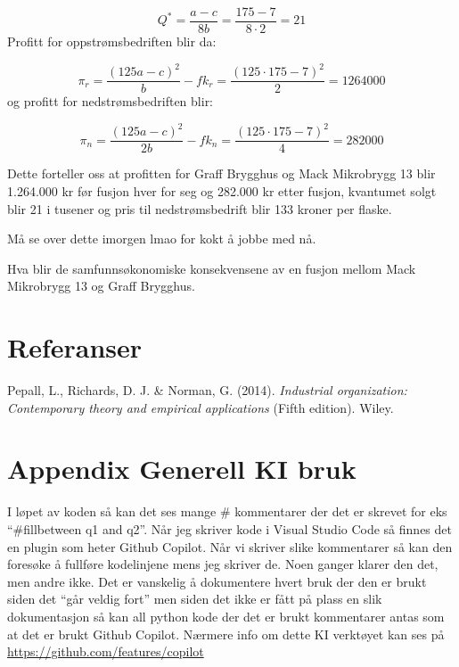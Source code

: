 \documentclass[
  12pt,
  a4paper,
  DIV=11,
  numbers=noendperiod]{scrartcl}
\newlength{\cslhangindent}
\newenvironment{CSLReferences}[2] %
 {\begin{list}{}{%
  \setlength{\itemindent}{0pt}
  \setlength{\leftmargin}{0pt}
  \setlength{\parsep}{0pt}
  \ifodd #1
   \setlength{\leftmargin}{\cslhangindent}
   \setlength{\itemindent}{-1\cslhangindent}
  \fi
  \setlength{\itemsep}{#2\baselineskip}}}
 {\end{list}}
\begin{document}
\[Q^* = \frac{a - c}{8b} = \frac{175 - 7}{8 \cdot 2} = 21 \tag{56}\]
Profitt for oppstrømsbedriften blir da:

\[\pi_r = \frac{(125a - c)^2}{b} - fk_r = \frac{(125 \cdot 175- 7)^2}{2}= 1264000 \tag{57}\]
og profitt for nedstrømsbedriften blir:

\[\pi_n = \frac{(125a - c)^2}{2b} - fk_n = \frac{(125 \cdot 175- 7)^2}{4}= 282000\tag{58}\]

Dette forteller oss at profitten for Graff Brygghus og Mack Mikrobrygg
13 blir 1.264.000 kr før fusjon hver for seg og 282.000 kr etter fusjon,
kvantumet solgt blir 21 i tusener og pris til nedstrømsbedrift blir 133
kroner per flaske.

Må se over dette imorgen lmao for kokt å jobbe med nå.

Hva blir de samfunnsøkonomiske konsekvensene av en fusjon mellom Mack
Mikrobrygg 13 og Graff Brygghus.

\clearpage

\section{Referanser}\label{referanser}

\label{refs}
\begin{CSLReferences}{1}{0}
Pepall, L., Richards, D. J. \& Norman, G. (2014). \emph{Industrial
organization: Contemporary theory and empirical applications} (Fifth
edition). Wiley.

\end{CSLReferences}

\clearpage

\appendix

\section {Appendix Generell KI bruk}

I løpet av koden så kan det ses mange \# kommentarer der det er skrevet
for eks ``\#fillbetween q1 and q2''. Når jeg skriver kode i Visual
Studio Code så finnes det en plugin som heter Github Copilot. Når vi
skriver slike kommentarer så kan den foresøke å fullføre kodelinjene
mens jeg skriver de. Noen ganger klarer den det, men andre ikke. Det er
vanskelig å dokumentere hvert bruk der den er brukt siden det ``går
veldig fort'' men siden det ikke er fått på plass en slik dokumentasjon
så kan all python kode der det er brukt kommentarer antas som at det er
brukt Github Copilot. Nærmere info om dette KI verktøyet kan ses på
\url{https://github.com/features/copilot}
\end{document}

